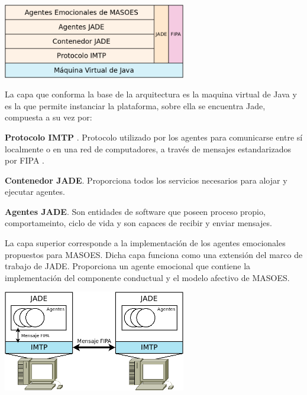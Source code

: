 \begin{ilustracion}[fuente=\yo, etiqueta=arquitectura-propuesta, titulo={Arquitectura de JADE Conjuntamente con MASOES}]
\includegraphics[width=8cm]{ilustraciones/propuesta/arquitectura.png}
\end{ilustracion}

La capa que conforma la base de la
arquitectura es la maquina virtual de Java y es la que permite
instanciar la plataforma, sobre ella se encuentra Jade, compuesta a su vez
por:

\textbf{Protocolo IMTP} .
Protocolo utilizado por los agentes
para comunicarse entre sí localmente o en una red de computadores,
a través de mensajes estandarizados por FIPA .

\textbf{Contenedor JADE}. Proporciona
todos los servicios necesarios para alojar y ejecutar agentes.

\textbf{Agentes JADE}. Son entidades de software que poseen proceso propio, comportameinto,
ciclo de vida y son capaces de recibir y enviar mensajes.

La capa superior corresponde a la implementación de los agentes emocionales
propuestos para MASOES. Dicha capa funciona como una extensión del marco de trabajo
de JADE. Proporciona un agente emocional que contiene la implementación
del componente conductual y el modelo afectivo de MASOES.

\begin{ilustracion}[fuente=\yo, etiqueta=comunicacion-entre-hosts, titulo={Comunicación Entre Agentes de JADE}]
\includegraphics[width=8cm]{ilustraciones/propuesta/comunicacion-entre-hosts.png}
\end{ilustracion}

